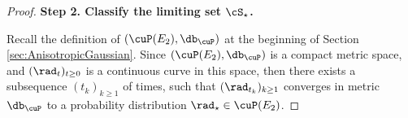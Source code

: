 \documentclass[11pt]{article}
\begin{document}
\begin{proof}
\vskip 0.2cm
\noindent
{\bf Step 2. Classify the limiting set $\cS_\star$. }
%
%
%
%

Recall the definition of $(\cuP(E_2), \db_\cuP)$ at the beginning of Section \ref{sec:AnisotropicGaussian}. Since $(\cuP(E_2), \db_\cuP)$ is a compact metric space, and $( \rad_t )_{t \ge 0}$ is a continuous curve in this space, then there exists a subsequence $(t_k)_{k \ge 1}$ of times, such that $(\rad_{t_k})_{k \ge 1}$ converges in metric $\db_\cuP$ to a probability distribution $\rad_\star \in \cuP(E_2)$. 


\end{proof}
\end{document}
